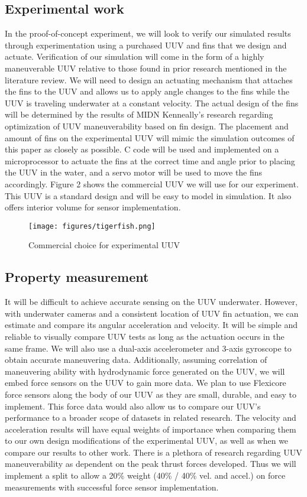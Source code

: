 \documentclass{IEEEtran}
\begin{document}
\subsection{Experimental work}
In the proof-of-concept experiment, we will look to verify our simulated results through experimentation using a purchased UUV and fins that we design and actuate. Verification of our simulation will come in the form of a highly maneuverable UUV relative to those found in prior research mentioned in the literature review. We will need to design an actuating mechanism that attaches the fins to the UUV and allows us to apply angle changes to the fins while the UUV is traveling underwater at a constant velocity. The actual design of the fins will be determined by the results of MIDN Kenneally’s research regarding optimization of UUV maneuverability based on fin design. The placement and amount of fins on the experimental UUV will mimic the simulation outcomes of this paper as closely as possible. C code will be used and implemented on a microprocessor to actuate the fins at the correct time and angle prior to placing the UUV in the water, and a servo motor will be used to move the fins accordingly. Figure 2 shows the commercial UUV we will use for our experiment. This UUV is a standard design and will be easy to model in simulation. It also offers interior volume for sensor implementation.
\begin{figure*}
\begin{center}
\texttt{[image: figures/tigerfish.png]}
\end{center}
\caption{Commercial choice for experimental UUV}
\label{fig:UUV}
\end{figure*}

\subsection{Property measurement}
It will be difficult to achieve accurate sensing on the UUV underwater. However, with underwater cameras and a consistent location of UUV fin actuation, we can estimate and compare its angular acceleration and velocity. It will be simple and reliable to visually compare UUV tests as long as the actuation occurs in the same frame. We will also use a dual-axis accelerometer and 3-axis gyroscope to obtain accurate maneuvering data. Additionally, assuming correlation of maneuvering ability with hydrodynamic force generated on the UUV, we will embed force sensors on the UUV to gain more data. We plan to use Flexicore force sensors along the body of our UUV as they are small, durable, and easy to implement. This force data would also allow us to compare our UUV’s performance to a broader scope of datasets in related research. The velocity and acceleration results will have equal weights of importance when comparing them to our own design modifications of the experimental UUV, as well as when we compare our results to other work. There is a plethora of research regarding UUV maneuverability as dependent on the peak thrust forces developed. Thus we will implement a split to allow a 20\% weight (40\% / 40\% vel. and accel.) on force measurements with successful force sensor implementation.
\end{document}
